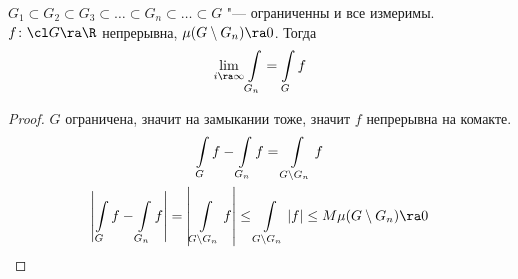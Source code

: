 \begin{lemma}
	$G_1 \subset G_2 \subset G_3 \subset \dots \subset G_n \subset \dots \subset G$ "--- ограниченны и все измеримы.
	$f\colon \cl G \ra \R$ непрерывна, $\mu (G \setminus G_n) \ra 0$.
	Тогда
	\[ \lim_{i \ra \infty} \int\limits_{G_n} = \int\limits_G f \]
\end{lemma}
\begin{proof}
	$G$ ограничена, значит на замыкании тоже, значит $f$ непрерывна на комакте.
	\begin{gather*}
		\int\limits_G f - \int\limits_{G_n} f = \int\limits_{G \setminus G_n} f \\
		\left| \int\limits_G f - \int\limits_{G_n} f \right| = \left| \int\limits_{G \setminus G_n} f \right|
		\le \int\limits_{G \setminus G_n} |f| \le M \mu(G \setminus G_n) \ra 0
	\end{gather*}
\end{proof}

